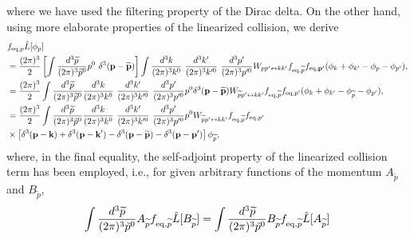 \documentclass[aps,prd,preprint,nofootinbib,amsmath,amssymb,showpacs,longbibliography,singlecolumn,superscriptaddress,10pt]{revtex4-1}
\theoremstyle{plain}
\theoremstyle{definition}
\begin{document}
%
where we have used the filtering property of the Dirac delta. On the other hand, using more elaborate properties of the linearized collision, we derive
%
\begin{equation}
\label{eq:apn-K-2}
\begin{aligned}
&
f_{\mathrm{eq},p}
\Hat{L}[\phi_{p}]
\\
&
=
\frac{(2 \pi)^{3}}{2}\left[\int \frac{d^{3}\widetilde{p}}{(2 \pi)^{3}\widetilde{p}^{0}} p^{0}\ \delta^{3}(\textbf{p} - \widetilde{\textbf{p}}) \right] \int \frac{d^{3}k}{(2 \pi)^{3} k^{0}} \ \frac{d^{3}k'}{(2 \pi)^{3} k'^{0}} \ \frac{d^{3}p'}{(2 \pi)^{3} p'^{0}}  W_{pp' \leftrightarrow kk'} f_{\mathrm{eq},\widetilde{p}} f_{\mathrm{eq},\textbf{p}'} (  \phi_{k} + \phi_{k'} - \phi_{p} - \phi_{p'}  ),
\\
&
=
\frac{(2 \pi)^{3}}{2} 
\int \frac{d^{3}\widetilde{p}}{(2 \pi)^{3}\widetilde{p}^{0}} 
\frac{d^{3}k}{(2 \pi)^{3} k^{0}} \ \frac{d^{3}k'}{(2 \pi)^{3} k'^{0}} \ \frac{d^{3}p'}{(2 \pi)^{3} p'^{0}} p^{0}
\delta^{3}(\textbf{p} - \widetilde{\textbf{p}})  
W_{\widetilde{p}p' \leftrightarrow kk'} 
f_{\mathrm{eq},\widetilde{p}}
f_{\mathrm{eq},p'} (  \phi_{k} + \phi_{k'} - \phi_{\widetilde{p}} - \phi_{p'}  ),
\\
&
=
\frac{(2 \pi)^{3}}{2} 
\int \frac{d^{3}\widetilde{p}}{(2 \pi)^{3}\Tilde{p}^{0}} 
\frac{d^{3}k}{(2 \pi)^{3} k^{0}} \ \frac{d^{3}k'}{(2 \pi)^{3} k'^{0}} \ \frac{d^{3}p'}{(2 \pi)^{3} p'^{0}}
p^{0} W_{\widetilde{p}p' \leftrightarrow kk'} f_{\mathrm{eq},\widetilde{p}} f_{\mathrm{eq},p'}  
\\
&
\times \left[\delta^{3}(\textbf{p} - \textbf{k}) 
+ 
 \delta^{3}(\textbf{p} - \textbf{k}') 
- 
\delta^{3}(\textbf{p} - \widetilde{\textbf{p}}) 
- 
\delta^{3}(\textbf{p} - \textbf{p}')  \right]  \phi_{\widetilde{p}},
\end{aligned}    
\end{equation}
%
where, in the final equality, the self-adjoint property of the linearized collision term has been employed, i.e., for given arbitrary functions of the momentum $A_{\widetilde{p}}$ and $B_{\widetilde{p}}$, 
%
\begin{equation}
\begin{aligned}
\int \frac{d^{3}\widetilde{p}}{(2 \pi)^{3}\Tilde{p}^{0}}
A_{\widetilde{p}}
f_{\mathrm{eq},\widetilde{p}}
\Hat{L}[B_{\widetilde{p}}]
=
\int \frac{d^{3}\widetilde{p}}{(2 \pi)^{3}\Tilde{p}^{0}}
B_{\widetilde{p}}
f_{\mathrm{eq},\widetilde{p}}
\Hat{L}[A_{\widetilde{p}}]
\end{aligned}    
\end{equation}
\end{document}
